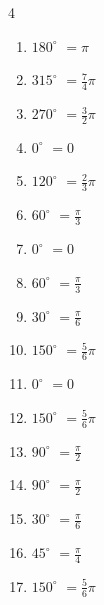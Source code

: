 \begin{multicols}{4}
\begin{enumerate}
  \item $\displaystyle 180^{\circ}$
        $\displaystyle =\pi$

  \item $\displaystyle 315^{\circ}$
        $\displaystyle =\frac{7}{4}\pi$

  \item $\displaystyle 270^{\circ}$
        $\displaystyle =\frac{3}{2}\pi$

  \item $\displaystyle 0^{\circ}$
        $\displaystyle =0$

\columnbreak %

\resetques

  \item $\displaystyle 120^{\circ}$
        $\displaystyle =\frac{2}{3}\pi$

  \item $\displaystyle 60^{\circ}$
        $\displaystyle =\frac{\pi}{3}$

  \item $\displaystyle 0^{\circ}$
        $\displaystyle =0$

  \item $\displaystyle 60^{\circ}$
        $\displaystyle =\frac{\pi}{3}$

  \item $\displaystyle 30^{\circ}$
        $\displaystyle =\frac{\pi}{6}$

  \item $\displaystyle 150^{\circ}$
        $\displaystyle =\frac{5}{6}\pi$

  \item $\displaystyle 0^{\circ}$
        $\displaystyle =0$

  \item $\displaystyle 150^{\circ}$
        $\displaystyle =\frac{5}{6}\pi$

  \item $\displaystyle 90^{\circ}$
        $\displaystyle =\frac{\pi}{2}$

  \item $\displaystyle 90^{\circ}$
        $\displaystyle =\frac{\pi}{2}$

  \item $\displaystyle 30^{\circ}$
        $\displaystyle =\frac{\pi}{6}$

  \item $\displaystyle 45^{\circ}$
        $\displaystyle =\frac{\pi}{4}$

  \item $\displaystyle 150^{\circ}$
        $\displaystyle =\frac{5}{6}\pi$


\end{enumerate}
\end{multicols}
